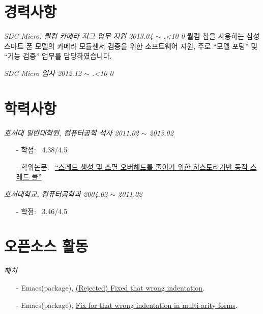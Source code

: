 \documentclass[line,margin]{res}
\renewcommand{\today}{\number\year.\ifnum\number\month<10 0\fi \number\month}
\begin{document}
\begin{resume}
  \section{경력사항}

  {\sl SDC Micro: 퀄컴 카메라 지그 업무 지원 \hfill 2013.04 $\sim$ \today}
  \vspace{1mm}
  \newline
  {
    \small
    퀄컴 칩을 사용하는 삼성 스마트 폰 모델의 카메라 모듈센서 검증을 위한 소프트웨어 지원,
    주로 ``모델 포팅'' 및 ``기능 검증'' 업무를 담당하였습니다.
  }

  {\sl SDC Micro 입사 \hfill 2012.12 $\sim$ \today}
  \vspace{0mm}


  \section{학력사항}

  {\sl 호서대 일반대학원, 컴퓨터공학 석사 \hfill 2011.02 $\sim$ 2013.02}
  \vspace{-4mm}
  {
    \small
    \begin{itemize}
    \item[-] 학점: ~4.38/4.5 \vspace{-1mm}
    \item[-] 학위논문: ~\href{http://dlibrary.hoseo.ac.kr/search/DetailView.ax?sid=4&cid=950591}
      {``스레드 생성 및 소멸 오버헤드를 줄이기 위한 히스토리기반 동적 스레드 풀''}
    \end{itemize}
  }

  {\sl 호서대학교, 컴퓨터공학과 \hfill 2004.02 $\sim$ 2011.02}
  \vspace{-4mm}
  {
    \small
    \begin{itemize}
    \item[-] 학점: ~3.46/4.5
    \end{itemize}
  }


  \section{오픈소스 활동}

  {\sl 패치}
  \vspace{-4mm}
  {
    \small
    \begin{itemize}
    \item[-] Emacs(package),
      \href{https://github.com/clojure-emacs/clojure-mode/pull/263}
      {\textcolor[gray]{0.5}{(Rejected)} Fixed that wrong indentation}.
    \item[-] Emacs(package),
      \href{https://github.com/clojure-emacs/clojure-mode/pull/257}
      {Fix for that wrong indentation in multi-arity forms}.
    \end{itemize}
  }


\end{resume}
\end{document}
